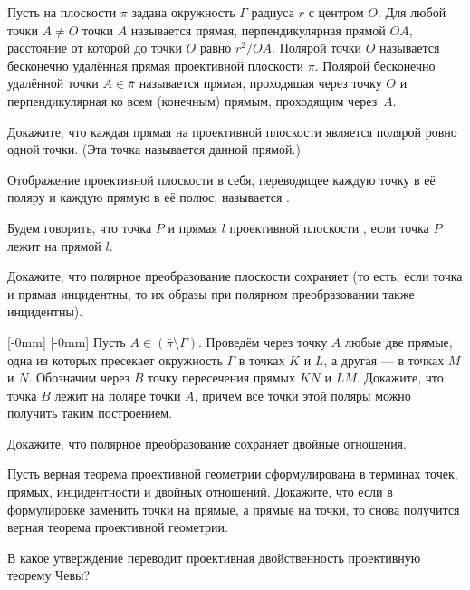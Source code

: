 \documentclass[a4paper,12pt]{article}
\newcommand{\rightpicture}[4]%
{\ifthenelse{\lengthtest{10mm>#3mm}}%
{\marginnote{\hbox to #1 {\hss\texttt{[image: \#4]}}}[-#2]}%
{\marginnote{\hbox to #1 {\hss\texttt{[image: \#4]}}}[-#2]}}
\begin{document}



 Пусть на плоскости $\pi$ задана окружность $\Gamma$ радиуса $r$
с центром $O$. Для любой точки $A\ne O$  точки $A$
называется прямая, перпендикулярная прямой $OA$, расстояние от
которой до точки $O$ равно $r^2/OA$. Полярой точки $O$ называется
бесконечно удалённая прямая проективной плоскости $\bar\pi$. Полярой
бесконечно удалённой точки $A\in\bar\pi$ называется прямая,
проходящая через точку $O$ и перпендикулярная ко всем (конечным)
прямым, проходящим через~$A$. 

 Докажите, что каждая прямая на проективной плоскости
является полярой ровно одной точки. (Эта точка называется
 данной прямой.) 

 Отображение проективной плоскости в себя, переводящее каждую
точку в её поляру и каждую прямую в её полюс, называется
. 

 Будем говорить, что точка $P$ и прямая $l$ проективной
плоскости , если точка $P$ лежит на прямой $l$.

 Докажите, что полярное преобразование плоскости сохраняет
 (то есть, если точка и прямая инцидентны, то их
образы при полярном преобразовании также инцидентны). 


\rightpicture{0mm}{0mm}{55mm}{proj_geom-6}
 Пусть
$A\in(\bar\pi\setminus\Gamma)$. Проведём через точку $A$ любые две
прямые, одна из которых пресекает окружность $\Gamma$ в точках $K$ и
$L$, а другая --- в точках $M$ и $N$. Обозначим через $B$ точку
пересечения прямых $KN$ и $LM$. Докажите, что точка $B$ лежит на
поляре точки $A$, причем все точки этой поляры можно получить таким
построением. 

 Докажите, что полярное преобразование сохраняет двойные
отношения. 

 Пусть верная теорема проективной
геометрии сформулирована в терминах точек, прямых, инцидентности и
двойных отношений. Докажите, что если в формулировке заменить точки
на прямые, а прямые на точки, то снова получится верная теорема
проективной геометрии. 

\label{Menelaus} В какое
утверждение переводит проективная двойственность проективную теорему
Чевы? 
\end{document}
